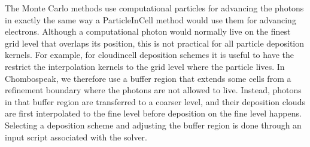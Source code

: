 \documentclass[letterpaper,10pt,english]{sphinxmanual}
\begin{document}
The Monte Carlo methods use computational particles for advancing the photons in exactly the same way a Particle\sphinxhyphen{}In\sphinxhyphen{}Cell method would use them for advancing electrons. Although a computational photon would normally live on the finest grid level that overlaps its position, this is not practical for all particle deposition kernels. For example, for cloud\sphinxhyphen{}in\sphinxhyphen{}cell deposition schemes it is useful to have the restrict the interpolation kernels to the grid level where the particle lives. In Chombo\sphinxhyphen{}speak, we therefore use a buffer region that extends some cells from a refinement boundary where the photons are not allowed to live. Instead, photons in that buffer region are transferred to a coarser level, and their deposition clouds are first interpolated to the fine level before deposition on the fine level happens. Selecting a deposition scheme and adjusting the buffer region is done through an input script associated with the solver.
\end{document}
